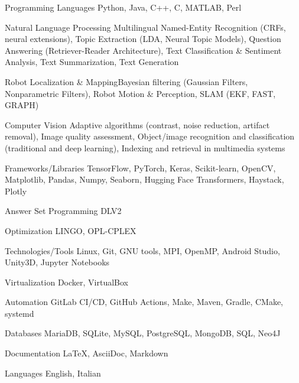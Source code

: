 

\begin{cvskills}

    
    \cvskill
    {Programming Languages}
    {Python, Java, C++, C, MATLAB, Perl}

    \cvskill
    {Natural Language Processing}
    {Multilingual Named-Entity Recognition (CRFs, neural extensions), Topic Extraction (LDA, Neural Topic Models), Question Answering (Retriever-Reader Architecture), Text Classification \& Sentiment Analysis, Text Summarization, Text Generation}

    \cvskill
    {Robot Localization \& Mapping}{Bayesian filtering (Gaussian Filters, Nonparametric Filters), Robot Motion \& Perception, SLAM (EKF, FAST, GRAPH)}    

    \cvskill
    {Computer Vision}
    {Adaptive algorithms (contrast, noise reduction, artifact removal), Image quality assessment, Object/image recognition and classification (traditional and deep learning), Indexing and retrieval in multimedia systems}

    
    \cvskill
    {Frameworks/Libraries}
    {TensorFlow, PyTorch, Keras, Scikit-learn, OpenCV, Matplotlib, Pandas, Numpy, Seaborn, Hugging Face Transformers, Haystack, Plotly}

    \cvskill
    {Answer Set Programming} %
    {DLV2} %

    \cvskill
    {Optimization} %
    {LINGO, OPL-CPLEX} %

    

    \cvskill
    {Technologies/Tools}
    {Linux, Git, GNU tools, MPI, OpenMP, Android Studio, Unity3D, Jupyter Notebooks}
    
    \cvskill
    {Virtualization}
    {Docker, VirtualBox}
    
    \cvskill
    {Automation}
    {GitLab CI/CD, GitHub Actions, Make, Maven, Gradle, CMake, systemd}
    
    \cvskill
    {Databases}
    {MariaDB, SQLite, MySQL, PostgreSQL, MongoDB, SQL, Neo4J}
    
    \cvskill
    {Documentation}
    {\LaTeX, AsciiDoc, Markdown}
    
    \cvskill
    {Languages} %
    {English, Italian} %

\end{cvskills}

